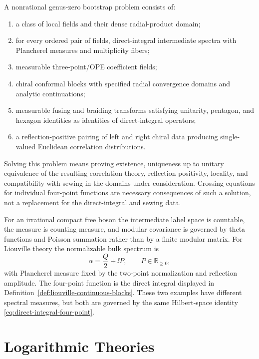 \begin{definition}
\label{def:nonrational-genus-zero-bootstrap-problem}
A nonrational genus-zero bootstrap problem consists of:
\begin{enumerate}
  \item a class of local fields and their dense radial-product domain;
  \item for every ordered pair of fields, direct-integral intermediate
  spectra with Plancherel measures and multiplicity fibers;
  \item measurable three-point/OPE coefficient fields;
  \item chiral conformal blocks with specified radial convergence domains
  and analytic continuations;
  \item measurable fusing and braiding transforms satisfying unitarity,
  pentagon, and hexagon identities as identities of direct-integral
  operators;
  \item a reflection-positive pairing of left and right chiral data producing
  single-valued Euclidean correlation distributions.
\end{enumerate}
Solving this problem means proving existence, uniqueness up to unitary
equivalence of the resulting correlation theory, reflection positivity,
locality, and compatibility with sewing in the domains under consideration.
Crossing equations for individual four-point functions are necessary
consequences of such a solution, not a replacement for the direct-integral
and sewing data.
\end{definition}

\begin{example}
\label{ex:nonrational-cft-two-spectral-types}
For an irrational compact free boson the intermediate label space is
countable, the measure is counting measure, and modular covariance is governed
by theta functions and Poisson summation rather than by a finite modular
matrix.  For Liouville theory the normalizable bulk spectrum is
\[
  \alpha=\frac Q2+\ii P,\qquad P\in\mathbb R_{\ge0},
\]
with Plancherel measure fixed by the two-point normalization and reflection
amplitude.  The four-point function is the direct integral displayed in
Definition~\ref{def:liouville-continuous-blocks}.  These two examples have
different spectral measures, but both are governed by the same Hilbert-space
identity \eqref{eq:direct-integral-four-point}.
\end{example}

\section{Logarithmic Theories}

